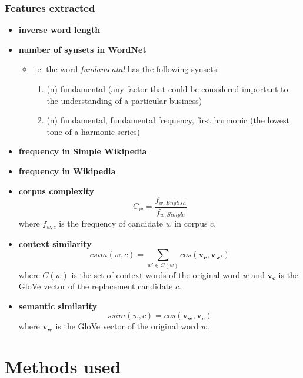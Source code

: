 \documentclass[utf8]{beamer}
\begin{document}
\begin{frame}
\frametitle{Features extracted}
\begin{itemize}
\item \textbf{inverse word length}
\item \textbf{number of synsets in WordNet}
\begin{itemize}
 \item i.e. the word \textit{fundamental} has the following synsets:
 \begin{enumerate}
  \item (n) fundamental (any factor that could be considered important to the understanding of a particular business)
  \item (n) fundamental, fundamental frequency, first harmonic (the lowest tone of a harmonic series)
 \end{enumerate}
\end{itemize}
\item \textbf{frequency in Simple Wikipedia}
\item \textbf{frequency in Wikipedia}
\item \textbf{corpus complexity}
\[ C_w = \frac{f_{w, English}}{f_{w, Simple}} \]
where $f_{w, c}$ is the frequency of candidate $w$ in corpus $c$. 
\end{itemize}
\end{frame}

\begin{frame}
\begin{itemize}
\frametitle{Features extracted}
\item \textbf{context similarity}
\[ csim(w, c) = \sum_{w' \in C(w)} cos(\mathbf{v_c}, \mathbf{v_{w'}}) \]
where $C(w)$ is the set of context words of the original word $w$ and $\mathbf{v_c}$ is the GloVe vector of the replacement candidate $c$. \\
\item \textbf{semantic similarity}
\[ ssim(w, c) = cos(\mathbf{v_w}, \mathbf{v_c}) \]
where $\mathbf{v_w}$ is the GloVe vector of the original word $w$.
\end{itemize}
\end{frame}

\section{Methods used}
\end{document}
